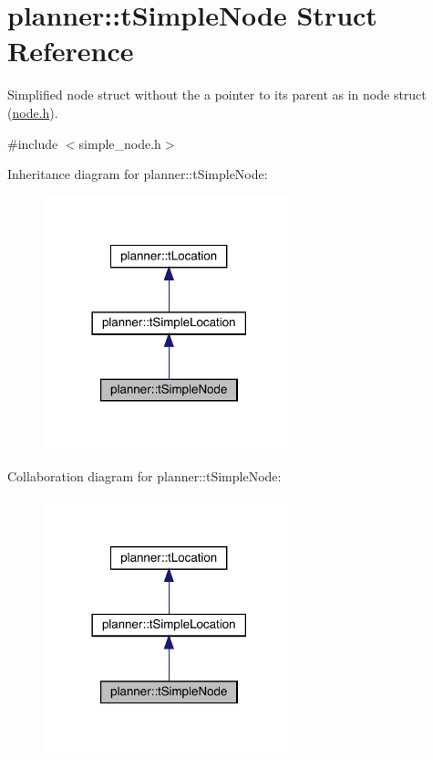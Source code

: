 \hypertarget{structplanner_1_1t_simple_node}{}\section{planner\+:\+:t\+Simple\+Node Struct Reference}
\label{structplanner_1_1t_simple_node}


Simplified node struct without the a pointer to its parent as in node struct (\mbox{\hyperlink{node_8h_source}{node.\+h}}).  




{\ttfamily \#include $<$simple\+\_\+node.\+h$>$}



Inheritance diagram for planner\+:\+:t\+Simple\+Node\+:
\nopagebreak
\begin{figure}[H]
\begin{center}
\leavevmode
\includegraphics[width=206pt]{structplanner_1_1t_simple_node__inherit__graph}
\end{center}
\end{figure}


Collaboration diagram for planner\+:\+:t\+Simple\+Node\+:
\nopagebreak
\begin{figure}[H]
\begin{center}
\leavevmode
\includegraphics[width=206pt]{structplanner_1_1t_simple_node__coll__graph}
\end{center}
\end{figure}
